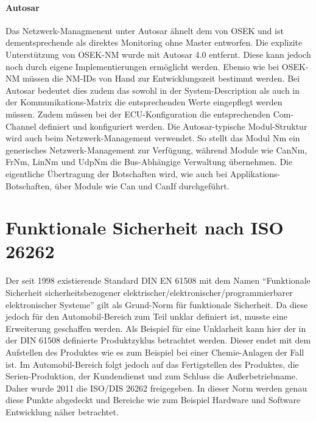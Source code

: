 \documentclass[
  a4paper,					    %
  twoside,
  DIV=calc,     				%
  bibliography=totoc,
  cleardoublepage=empty,
  ngerman,     					%
  final       					%
]{scrbook}
\begin{document}
\paragraph{Autosar}
Das Netzwerk-Managmenent unter Autosar ähnelt dem von OSEK und ist dementsprechende als direktes Monitoring ohne Master entworfen. Die explizite Unterstützung von OSEK-NM wurde mit Autosar 4.0 entfernt. Diese kann jedoch noch durch eigene Implementierungen ermöglicht werden. Ebenso wie bei OSEK-NM müssen die NM-IDs von Hand zur Entwicklungszeit bestimmt werden. Bei Autosar bedeutet dies zudem das sowohl in der System-Description als auch in der Kommunikations-Matrix die entsprechenden Werte eingepflegt werden müssen. Zudem müssen bei der ECU-Konfiguration die entsprechenden Com-Channel definiert und konfiguriert werden. Die Autosar-typische Modul-Struktur wird auch beim Netzwerk-Management verwendet. So stellt das Modul Nm ein generisches Netzwerk-Management zur Verfügung, während Module wie CanNm, FrNm, LinNm und UdpNm die Bus-Abhängige Verwaltung übernehmen. Die eigentliche Übertragung der Botschaften wird, wie auch bei Applikations-Botschaften, über Module wie Can und CanIf durchgeführt.



\section{Funktionale Sicherheit nach ISO 26262}
\label{sec:Sicherheit}
Der seit 1998 existierende Standard DIN EN 61508 mit dem Namen "`Funktionale Sicherheit sicherheitsbezogener elektrischer/elektronischer/programmierbarer elektronischer Systeme"' gilt als Grund-Norm für funktionale Sicherheit. Da diese jedoch für den Automobil-Bereich zum Teil unklar definiert ist, musste eine Erweiterung geschaffen werden. Als Beispiel für eine Unklarheit kann hier der in der DIN 61508 definierte Produktzyklus betrachtet werden. Dieser endet mit dem Aufstellen des Produktes wie es zum Beispiel bei einer Chemie-Anlagen der Fall ist. Im Automobil-Bereich folgt jedoch auf das Fertigstellen des Produktes, die Serien-Produktion, der Kundendienst und zum Schluss die Außerbetriebname. Daher wurde 2011 die ISO/DIS 26262 freigegeben. In dieser Norm werden genau diese Punkte abgedeckt und Bereiche wie zum Beispiel Hardware und Software Entwicklung näher betrachtet.
\end{document}
